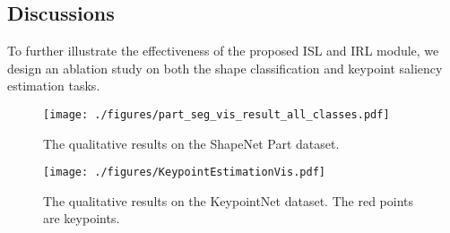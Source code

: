 \documentclass[journal]{IEEEtran}
\begin{document}
\begin{comment}
\noindent\textbf{Results}
In Table~\ref{table:s3dis 6fold} and Table~\ref{table:s3dis_area5}, we report two types of methods according to their inputs. As shown, the proposed PRA-Net outperforms all the compared methods in terms of OA on both two settings mentioned above, reaching 89.8\% and 89.4\%, respectively. When compared with HPEIN~\cite{jiang2019hierarchical} and PointASNL~\cite{yan2020pointasnl}, our method achieves competitive results in mIoU. The reason behind this may be that 
all these methods split each room into blocks with paddings and the points in the padding areas provide more context information for the internal points in each block, while ours does not. Besides, since FPConv~\cite{lin2020fpconv} operates on larger blocks and consumes more points as inputs, our slightly inferior performance is also acceptable. We also provide the qualitative results of semantic scene segmentation on the S3DIS dataset in Fig.~\ref{Fig.S3DIS_vis}, where we show the input point cloud, ground truth and prediction. As shown, PRA-Net could well distinguish some unobtrusive object parts, like legs of chair and table. However, there also exist some failure examples. For instance, part of the beam is misidentified as wall in the last case. The reason for this might be that the two classes are quite similar in shape structures, and need more features like normal vectors to discriminate.
\end{comment}




\subsection{Discussions}\label{ablation}
To further illustrate the effectiveness of the proposed ISL and IRL module, we design an ablation study on both the shape classification and keypoint saliency estimation tasks.



\begin{figure}[t]
\begin{center}
    \texttt{[image: ./figures/part\_seg\_vis\_result\_all\_classes.pdf]}
\end{center}
\caption{The qualitative results on the ShapeNet Part dataset.}
\label{Fig.part segmentation visualization results}
\end{figure}






\begin{figure*}[t]
\begin{center}
  \texttt{[image: ./figures/KeypointEstimationVis.pdf]}
\end{center}
\caption{The qualitative results on the KeypointNet dataset. The red points are keypoints.}
\label{Fig.KeypointNet visualization result}
\end{figure*}
\end{document}
